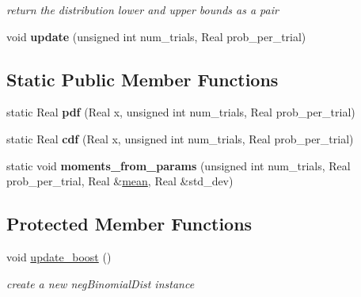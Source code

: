 \begin{DoxyCompactItemize}
\begin{DoxyCompactList}\small\item\em return the distribution lower and upper bounds as a pair \end{DoxyCompactList}\item 
void {\bfseries update} (unsigned int num\+\_\+trials, Real prob\+\_\+per\+\_\+trial)\label{classPecos_1_1NegBinomialRandomVariable_a87163ad5a4f469108f079d0e8c6c2cb8}

\end{DoxyCompactItemize}
\subsection*{Static Public Member Functions}
\begin{DoxyCompactItemize}
\item 
static Real {\bfseries pdf} (Real x, unsigned int num\+\_\+trials, Real prob\+\_\+per\+\_\+trial)\label{classPecos_1_1NegBinomialRandomVariable_a2886ea0e23e30bbbc464565416eb6614}

\item 
static Real {\bfseries cdf} (Real x, unsigned int num\+\_\+trials, Real prob\+\_\+per\+\_\+trial)\label{classPecos_1_1NegBinomialRandomVariable_a630e535fde694c4b082312a4fd082f3d}

\item 
static void {\bfseries moments\+\_\+from\+\_\+params} (unsigned int num\+\_\+trials, Real prob\+\_\+per\+\_\+trial, Real \&\hyperlink{classPecos_1_1NegBinomialRandomVariable_a962ffe5a3593be370d5c883365c060f4}{mean}, Real \&std\+\_\+dev)\label{classPecos_1_1NegBinomialRandomVariable_ab5304d2842c683e30818638d9e7150ba}

\end{DoxyCompactItemize}
\subsection*{Protected Member Functions}
\begin{DoxyCompactItemize}
\item 
void \hyperlink{classPecos_1_1NegBinomialRandomVariable_aaa6750cbee2245416a6eeeac58d4405a}{update\+\_\+boost} ()\label{classPecos_1_1NegBinomialRandomVariable_aaa6750cbee2245416a6eeeac58d4405a}

\begin{DoxyCompactList}\small\item\em create a new neg\+Binomial\+Dist instance \end{DoxyCompactList}\end{DoxyCompactItemize}
